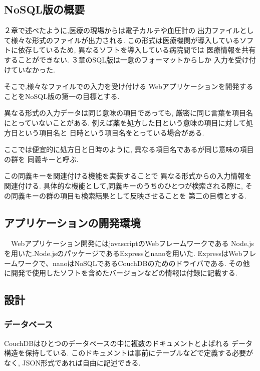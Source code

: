 \subsection{NoSQL版の概要}
	２章で述べたように,医療の現場からは電子カルテや血圧計の
	出力ファイルとして様々な形式のファイルが出力される.
	この形式は医療機関が導入しているソフトに依存しているため,
	異なるソフトを導入している病院間では
	医療情報を共有することができない.
	３章のSQL版は一意のフォーマットからしか
	入力を受け付けていなかった.



  そこで,様々なファイルでの入力を受け付ける
  Webアプリケーションを開発することをNoSQL版の第一の目標とする.

  異なる形式の入力データは同じ意味の項目であっても,
  厳密に同じ言葉を項目名にとっていないことがある.
	例えば薬を処方した日という意味の項目に対して処方日という項目名と
	日時という項目名をとっている場合がある.

  ここでは便宜的に処方日と日時のように,
	異なる項目名であるが同じ意味の項目の群を
  同義キーと呼ぶ.

  この同義キーを関連付ける機能を実装することで
	異なる形式からの入力情報を関連付ける.
  具体的な機能として,同義キーのうちのひとつが検索される際に,
  その同義キーの群の項目も検索結果として反映させることを
	第二の目標とする.

\subsection{アプリケーションの開発環境}

　Webアプリケーション開発にはjavascriptのWebフレームワークである
	Node.jsを用いた.Node.jsのパッケージであるExpressとnanoを用いた.
	ExpressはWebフレームワークで、nanoはNoSQLであるCouchDBのためのドライバである.
	その他に開発で使用したソフトを含めたバージョンなどの情報は付録に記載する.


\subsection{設計}
\subsubsection{データベース}
	CouchDBはひとつのデータベースの中に複数のドキュメントとよばれる
	データ構造を保持している.
	このドキュメントは事前にテーブルなどで定義する必要がなく,
	JSON形式であれば自由に記述できる.

